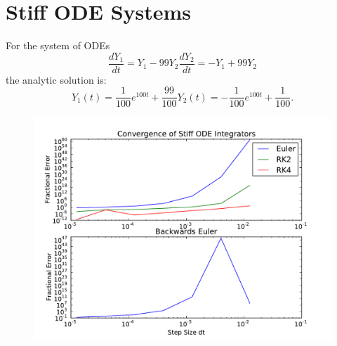 \documentclass{article}
\begin{document}
\section{Stiff ODE Systems}
For the system of ODEs
\begin{subequations}
\begin{equation}
	\frac{dY_1}{dt} = Y_1 - 99 Y_2
\end{equation}
\begin{equation}
	\frac{dY_2}{dt} = - Y_1 + 99 Y_2
\end{equation}
\end{subequations}
the analytic solution is:
\begin{subequations}
\begin{equation}
	Y_1(t) = \frac{1}{100} e^{100t} + \frac{99}{100}
\end{equation}
\begin{equation}
	Y_2(t) = - \frac{1}{100} e^{100t} + \frac{1}{100}.
\end{equation}
\end{subequations}

\begin{figure}[h]
  \begin{center}
     \includegraphics[width=\textwidth]{stiff}
  \end{center}
  \label{fig:stiff}
\end{figure}
\end{document}
